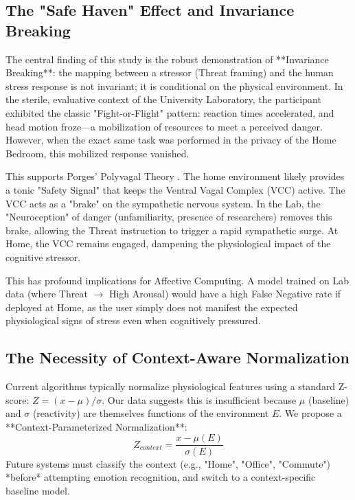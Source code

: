 \documentclass[journal]{IEEEtran}
\begin{document}
\subsection{The "Safe Haven" Effect and Invariance Breaking}
The central finding of this study is the robust demonstration of **Invariance Breaking**: the mapping between a stressor (Threat framing) 
and the human stress response is not invariant; it is conditional on the physical environment.
In the sterile, evaluative context of the University Laboratory, the participant exhibited the classic "Fight-or-Flight" pattern: 
reaction times accelerated, and head motion froze—a mobilization of resources to meet a perceived danger.
However, when the exact same task was performed in the privacy of the Home Bedroom, this mobilized response vanished.

This supports Porges' Polyvagal Theory \cite{polyvagal}. The home environment likely provides a tonic "Safety Signal" that keeps the Ventral Vagal Complex (VCC) active.
The VCC acts as a "brake" on the sympathetic nervous system. In the Lab, the "Neuroception" of danger (unfamiliarity, presence of researchers) 
removes this brake, allowing the Threat instruction to trigger a rapid sympathetic surge. 
At Home, the VCC remains engaged, dampening the physiological impact of the cognitive stressor.

This has profound implications for Affective Computing. A model trained on Lab data (where Threat $\to$ High Arousal) 
would have a high False Negative rate if deployed at Home, as the user simply does not manifest the expected physiological signs of stress 
even when cognitively pressured.

\subsection{The Necessity of Context-Aware Normalization}
Current algorithms typically normalize physiological features using a standard Z-score: $Z = (x - \mu) / \sigma$.
Our data suggests this is insufficient because $\mu$ (baseline) and $\sigma$ (reactivity) are themselves functions of the environment $E$.
We propose a **Context-Parameterized Normalization**:
\begin{equation}
    Z_{context} = \frac{x - \mu(E)}{\sigma(E)}
\end{equation}
Future systems must classify the context (e.g., "Home", "Office", "Commute") *before* attempting emotion recognition, 
and switch to a context-specific baseline model.
\end{document}
